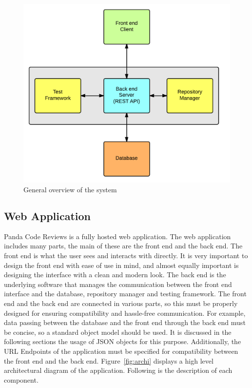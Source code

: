 

\begin{figure}[H]
	\centering
	\includegraphics[scale=0.15]{img/bigArquitectOverview}
	\caption{General overview of the system\label{arqu}}
\end{figure}

\subsection{Web Application}

Panda Code Reviews is a fully hosted web application. The web application
includes many parts, the main of these are the front end and the back end. The
front end is what the user sees and interacts with directly. It is very
important to design the front end with ease of use in mind, and almost equally
important is designing the interface with a clean and modern look. The back end
is the underlying software that manages the communication between the front end
interface and the database, repository manager and testing framework. The front
end and the back end are connected in various parts, so this must be properly
designed for ensuring compatibility and hassle-free communication. For example,
data passing between the database and the front end through the back end must be
concise, so a standard object model should be used. It is discussed in the
following sections the usage of JSON\cite{JSON} objects for this purpose.
Additionally, the URL Endpoints of the application must be specified for
compatibility between the front end and the back end. Figure~\ref{fig:archi}
displays a high level architectural diagram of the application. Following is the
description of each component.

